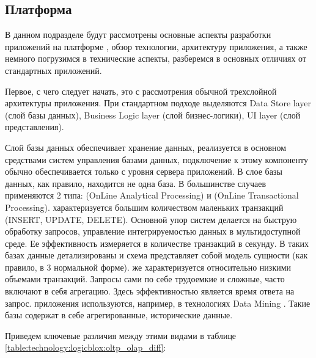 \subsection{Платформа \LB}
\label{sec:technology:logicblox}

В данном подразделе будут рассмотрены основные аспекты разработки приложений на платформе \LB, обзор технологии, архитектуру приложения, а также немного погрузимся в технические аспекты, разберемся в основных отличиях от стандартных приложений.

Первое, с чего следует начать, это с рассмотрения обычной трехслойной архитектуры приложения. При стандартном подходе выделяются Data Store layer (слой базы данных), Business Logic layer (слой бизнес-логики), UI layer (слой представления).

Слой базы данных обеспечивает хранение данных, реализуется в основном средствами систем управления базами данных, подключение к этому компоненту обычно обеспечивается только с уровня сервера приложений. В слое базы данных, как правило, находится не одна база. В большинстве случаев применяются 2 типа: \olap (OnLine Analytical Processing) и \oltp (OnLine Transactional Processing).
\oltp характеризуется большим количеством маленьких транзакций (INSERT, UPDATE, DELETE). Основной упор \oltp систем делается на быструю обработку запросов, управление интегрируемостью данных в мультидоступной среде. Ее эффективность измеряется в количестве транзакций в секунду. В таких базах данные детализированы и схема представляет собой модель сущности (как правило, в 3 нормальной форме).
\olap же характеризуется относительно низкими объемами транзакций. Запросы сами по себе трудоемкие и сложные, часто включают в себя агрегацию. Здесь эффективностью является время ответа на запрос. \olap приложения используются, например, в технологиях Data Mining \cite{olap_and_data_mining}. Такие базы содержат в себе агрегированные, исторические данные.

Приведем ключевые различия между этими видами в таблице \ref{table:technology:logicblox:oltp_olap_diff}:

